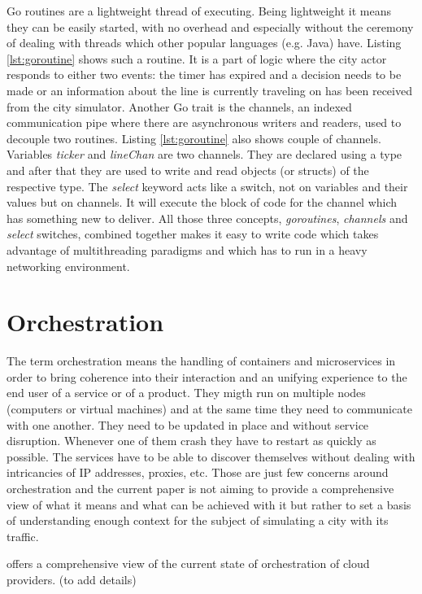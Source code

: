 \documentclass[conference]{IEEEtran}
\begin{document}
Go routines are a lightweight thread of executing. Being lightweight it means they can be easily started, with no overhead and especially without the ceremony of dealing with threads which other popular languages (e.g. Java) have. Listing \ref{lst:goroutine} shows such a routine. It is a part of logic where the city actor responds to either two events: the timer has expired and a decision needs to be made or an information about the line is currently traveling on has been received from the city simulator. Another Go trait is the channels, an indexed communication pipe where there are asynchronous writers and readers, used to decouple two routines. Listing \ref{lst:goroutine} also shows couple of channels. Variables \textit{ticker} and \textit{lineChan} are two channels. They are declared using a type and after that they are used to write and read objects (or structs) of the respective type. The \textit{select} keyword acts like a switch, not on variables and their values but on channels. It will execute the block of code for the channel which has something new to deliver. All those three concepts, \textit{goroutines}, \textit{channels} and \textit{select} switches, combined together makes it easy to write code which takes advantage of multithreading paradigms and which has to run in a heavy networking environment.

\section{Orchestration}
\label{sec:orchestration}

The term orchestration means the handling of containers and microservices in order to bring coherence into their interaction and an unifying experience to the end user of a service or of a product. They migth run on multiple nodes (computers or virtual machines) and at the same time they need to communicate with one another. They need to be updated in place and without service disruption. Whenever one of them crash they have to restart as quickly as possible. The services have to be able to discover themselves without dealing with intricancies of IP addresses, proxies, etc. Those are just few concerns around orchestration and the current paper is not aiming to provide a comprehensive view of what it means and what can be achieved with it but rather to set a basis of understanding enough context for the subject of simulating a city with its traffic.

\cite{7922500} offers a comprehensive view of the current state of orchestration of cloud providers. (to add details)
\end{document}
